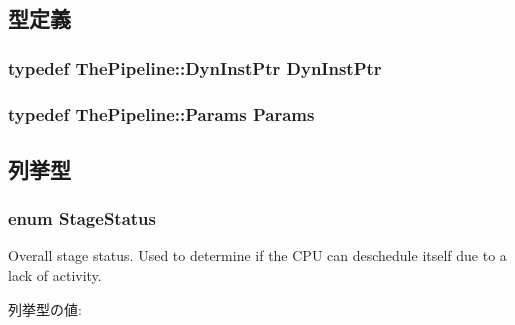 \subsection{型定義}
\hypertarget{classPipelineStage_af9d0c8a46736ba6aa2d8bb94da1a5e73}{
\subsubsection[{DynInstPtr}]{\setlength{\rightskip}{0pt plus 5cm}typedef {\bf ThePipeline::DynInstPtr} {\bf DynInstPtr}}}
\label{classPipelineStage_af9d0c8a46736ba6aa2d8bb94da1a5e73}
\hypertarget{classPipelineStage_aa14874985381292db0aea05d1c8a122c}{
\subsubsection[{Params}]{\setlength{\rightskip}{0pt plus 5cm}typedef {\bf ThePipeline::Params} {\bf Params}}}
\label{classPipelineStage_aa14874985381292db0aea05d1c8a122c}


\subsection{列挙型}
\hypertarget{classPipelineStage_add44b42ba3608b213fc0986c4aee6018}{
\subsubsection[{StageStatus}]{\setlength{\rightskip}{0pt plus 5cm}enum {\bf StageStatus}}}
\label{classPipelineStage_add44b42ba3608b213fc0986c4aee6018}
Overall stage status. Used to determine if the CPU can deschedule itself due to a lack of activity. \begin{Desc}
\item[列挙型の値: ]\par
\begin{description}
\item[{\em 
\hypertarget{classPipelineStage_add44b42ba3608b213fc0986c4aee6018a26bd8444261cc58df7a86753c79d2520}{
Active}
\label{classPipelineStage_add44b42ba3608b213fc0986c4aee6018a26bd8444261cc58df7a86753c79d2520}
}]\item[{\em 
\hypertarget{classPipelineStage_add44b42ba3608b213fc0986c4aee6018a969c924a722daf6334fca64346092ae6}{
Inactive}
\label{classPipelineStage_add44b42ba3608b213fc0986c4aee6018a969c924a722daf6334fca64346092ae6}
}]\end{description}
\end{Desc}




